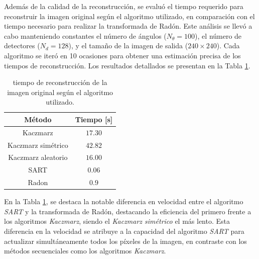 \documentclass[11pt, twocolumn]{article}
\begin{document}
Además de la calidad de la reconstrucción, se evaluó el tiempo requerido para reconstruir la imagen original según el algoritmo utilizado, en comparación con el tiempo necesario para realizar la transformada de Radón. Este análisis se llevó a cabo manteniendo constantes el número de ángulos ($N_\theta = 100$), el número de detectores ($N_d = 128$), y el tamaño de la imagen de salida ($240\times240$). Cada algoritmo se iteró en 10 ocasiones para obtener una estimación precisa de los tiempos de reconstrucción. Los resultados detallados se presentan en la Tabla \ref{tab:ej_2_times}.



\begin{table}[htpb]
  \centering
  \begin{tabular}{|c|c|}
    \hline
    \textbf{Método} & \textbf{Tiempo [s]} \\ \hline
    Kaczmarz & $17.30$ \\ \hline
    Kaczmarz simétrico & $42.82$ \\ \hline
    Kaczmarz aleatorio & $16.00$ \\ \hline
    SART & $0.06$ \\ \hline
    Radon & $0.9$ \\ \hline
  \end{tabular}
  \caption{tiempo de reconstrucción de la imagen original según el algoritmo utilizado.}
  \label{tab:ej_2_times}
\end{table}

En la Tabla \ref{tab:ej_2_times}, se destaca la notable diferencia en velocidad entre el algoritmo \textit{SART} y la transformada de Radón, destacando la eficiencia del primero frente a los algoritmos \textit{Kaczmarz}, siendo el \textit{Kaczmarz simétrico} el más lento. Esta diferencia en la velocidad se atribuye a la capacidad del algoritmo \textit{SART} para actualizar simultáneamente todos los píxeles de la imagen, en contraste con los métodos secuenciales como los algoritmos \textit{Kaczmarz}.
\end{document}
